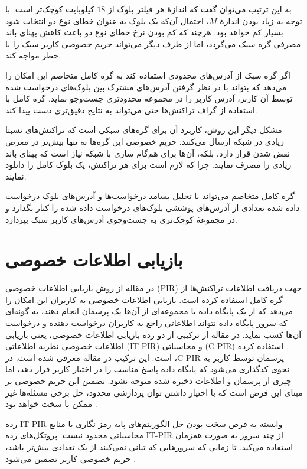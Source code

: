 به این ترتیب می‌توان گفت که اندازهٔ هر فیلتر بلوک از $18$ کیلوبایت کوچک‌تر است. با توجه به زیاد بودن اندازهٔ $M$، احتمال آن‌که یک بلوک به عنوان خطای نوع دو انتخاب شود بسیار کم خواهد بود. هرچند که کم بودن نرخ خطای نوع دو باعث کاهش پهنای باند مصرفی گره سبک می‌گردد، اما از طرف دیگر می‌تواند حریم خصوصی کاربر سبک را با خطر مواجه کند.

اگر گره سبک از آدرس‌های محدودی استفاده کند به گره کامل متخاصم این امکان را می‌دهد که بتواند با در نظر گرفتن آدرس‌های مشترک بین بلوک‌های درخواست شده توسط آن کاربر، آدرس کاربر را در مجموعه محدود‌تری جست‌وجو نماید. گره کامل با استفاده از گراف تراکنش‌ها حتی می‌تواند به نتایج دقیق‌تری دست پیدا کند\cite{blockfilter-wiki}.

مشکل دیگر این روش، کاربرد آن برای گره‌های سبکی است که تراکنش‌های نسبتا زیادی در شبکه ارسال می‌کنند. حریم خصوصی این گره‌ها نه تنها بیش‌تر در معرض نقض شدن قرار دارد، بلکه، آن‌ها برای هم‌گام سازی با شبکه نیاز است که پهنای باند زیادی را مصرف نمایند. چرا که لازم است برای هر تراکنش، یک بلوک کامل را دانلود نمایند.

گره کامل متخاصم می‌تواند با تحلیل‌ بسامد درخواست‌ها و آدرس‌های بلوک درخواست داده شده تعدادی از آدرس‌های پوششی بلوک‌های درخواست داده شده را کنار بگذارد و در مجموعهٔ کوچک‌تری به جست‌و‌جوی آدرس‌‌های کاربر سبک بپردازد.

\section{بازیابی اطلاعات خصوصی}
\label{PIR}
در مقاله \cite{Qin2019} از روش بازیابی اطلاعات خصوصی (PIR) جهت دریافت اطلاعات تراکنش‌ها از گره‌ کامل استفاده کرده است. بازیابی اطلاعات خصوصی به کاربران این امکان را می‌دهد که از یک پایگاه داده یا مجموعه‌ای از آن‌ها یک پرسمان انجام دهند، به گونه‌ای که سرور پایگاه داده نتواند اطلاعاتی راجع ‌به کاربران درخواست دهنده و درخواست آن‌ها کسب نماید. در مقاله \cite{Qin2019}  از ترکیبی از دو رده بازیابی اطلاعات خصوصی، یعنی بازیابی اطلاعات خصوصی نظریه اطلاعاتی (IT-PIR) و محاسباتی (C-PIR) استفاده کرده است. این ترکیب در مقاله \cite{Devet2014} معرفی شده است. در ،C-PIR  پرسمان توسط کاربر به نحوی کدگذاری می‌شود که پایگاه داده پاسخ مناسب را در اختیار کاربر قرار دهد، اما چیزی از پرسمان و اطلاعات ذخیره شده متوجه نشود. تضمین این حریم خصوصی بر مبنای این فرض است که با اختیار داشتن توان پردازشی محدود، حل برخی مسئله‌ها  غیر ممکن یا سخت خواهد بود \cite{Devet2014}.

رده IT-PIR وابسته به فرض سخت بودن حل الگوریتم‌های پایه رمز نگاری با منابع محاسباتی محدود نیست. پروتکل‌های رده IT-PIR از چند سرور به صورت همزمان استفاده می‌کند. تا زمانی که سرورهایی که تبانی نمی‌کنند از یک تعدادی بیش‌تر باشد، حریم خصوصی کاربر تضمین می‌شود \cite{Devet2014}. 

